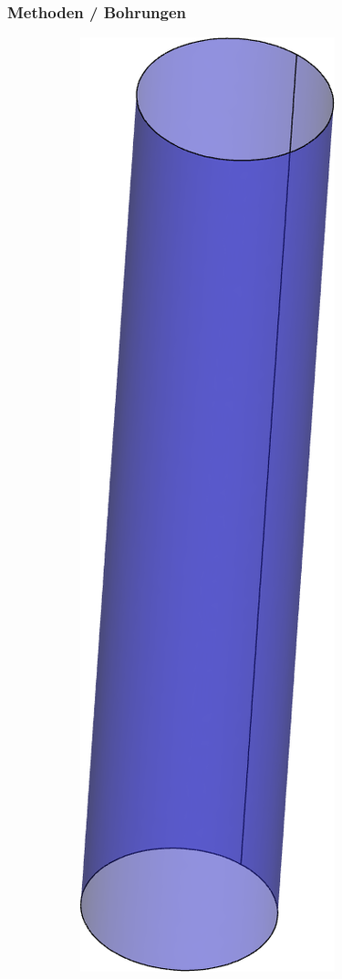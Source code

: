 \documentclass[8pt, aspectratio=169]{beamer}
\begin{document}
\begin{frame}
	\frametitle{Methoden / Bohrungen}
	\vspace{-1cm}\hspace{2.5cm}
	\begin{figure}
		\centering
		\begin{subfigure}{.3\textwidth}
			\includegraphics[height=.7\textheight]{../tec/holes/16.png}

\end{subfigure}
\end{figure}
\end{frame}
\end{document}
